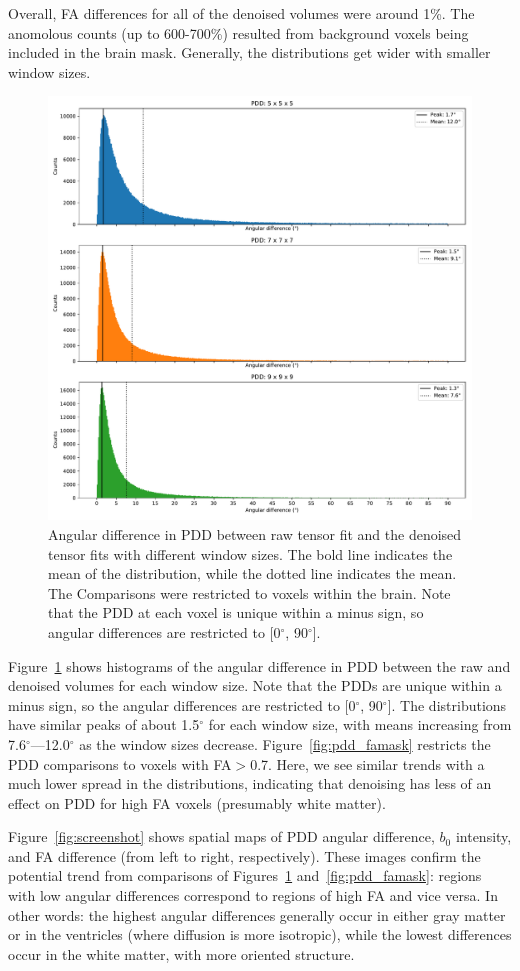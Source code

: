 \documentclass{article}
\begin{document}
Overall, FA differences for all of the denoised volumes were around 1\%. The
anomolous counts (up to 600-700\%) resulted from background voxels being included
in the brain mask. Generally, the distributions get wider with smaller window
sizes.


\begin{figure}[h]
  \centering
  \captionsetup{width=0.6\linewidth}
  \includegraphics[width=0.6\linewidth]{../figs/noreg_pdd}
  \caption{Angular difference in PDD between raw tensor fit and the denoised
    tensor fits with different window sizes. The bold line indicates the mean
    of the distribution, while the dotted line indicates the mean. The
    Comparisons were restricted to voxels within the brain.  Note that the PDD
    at each voxel is unique within a minus sign, so angular differences are
    restricted to [0$^{\circ}$, 90$^{\circ}$].}
  \label{fig:pdd}
\end{figure}


Figure~\ref{fig:pdd} shows histograms of the angular difference in PDD between
the raw and denoised volumes for each window size. Note that the PDDs are
unique within a minus sign, so the angular differences are restricted to
[0$^{\circ}$, 90$^{\circ}$]. The distributions have similar peaks of about
1.5$^{\circ}$ for each window size, with means increasing from
7.6$^{\circ}$---12.0$^{\circ}$ as the window sizes
decrease. Figure~\ref{fig:pdd_famask} restricts the PDD comparisons to voxels
with FA$>$0.7. Here, we see similar trends with a much lower spread in the
distributions, indicating that denoising has less of an effect on PDD for high
FA voxels (presumably white matter).

Figure~\ref{fig:screenshot} shows spatial maps of PDD angular difference, $b_0$
intensity, and FA difference (from left to right, respectively). These images
confirm the potential trend from comparisons of Figures~\ref{fig:pdd}
and~\ref{fig:pdd_famask}: regions with low angular differences correspond to
regions of high FA and vice versa. In other words: the highest angular
differences generally occur in either gray matter or in the ventricles (where
diffusion is more isotropic), while the lowest differences occur in the white
matter, with more oriented structure.
\end{document}
